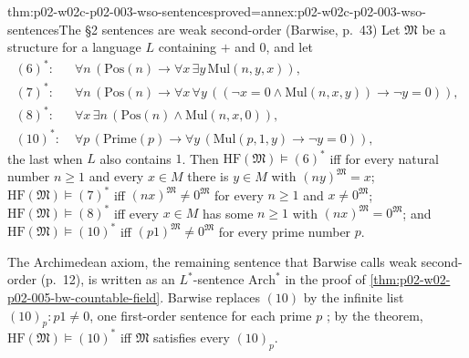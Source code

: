 \begin{hbtheorem}{thm:p02-w02c-p02-003-wso-sentences}{proved=annex:p02-w02c-p02-003-wso-sentences}{The \S2 sentences are weak second-order (Barwise, p.~43)}
Let \(\mathfrak M\) be a structure for a language \(L\) containing \(+\)
and \(0\), and let
\begin{align*}
(6)^{*}\colon\;&\forall n\,(\mathrm{Pos}(n)\to\forall x\,\exists y\,
  \mathrm{Mul}(n,y,x)),\\
(7)^{*}\colon\;&\forall n\,(\mathrm{Pos}(n)\to\forall x\,\forall y\,
  ((\neg x=0\land\mathrm{Mul}(n,x,y))\to\neg y=0)),\\
(8)^{*}\colon\;&\forall x\,\exists n\,(\mathrm{Pos}(n)\land
  \mathrm{Mul}(n,x,0)),\\
(10)^{*}\colon\;&\forall p\,(\mathrm{Prime}(p)\to\forall y\,
  (\mathrm{Mul}(p,1,y)\to\neg y=0)),
\end{align*}
the last when \(L\) also contains \(1\).  Then
\(\mathrm{HF}(\mathfrak M)\models(6)^{*}\) iff for every natural number
\(n\geq1\) and every \(x\in M\) there is \(y\in M\) with
\((ny)^{\mathfrak M}=x\); \(\mathrm{HF}(\mathfrak M)\models(7)^{*}\) iff
\((nx)^{\mathfrak M}\neq0^{\mathfrak M}\) for every \(n\geq1\) and
\(x\neq0^{\mathfrak M}\); \(\mathrm{HF}(\mathfrak M)\models(8)^{*}\) iff
every \(x\in M\) has some \(n\geq1\) with
\((nx)^{\mathfrak M}=0^{\mathfrak M}\); and
\(\mathrm{HF}(\mathfrak M)\models(10)^{*}\) iff
\((p1)^{\mathfrak M}\neq0^{\mathfrak M}\) for every prime number \(p\).
\end{hbtheorem}

The Archimedean axiom, the remaining sentence that Barwise calls weak
second-order (p.~12), is written as an \(L^{*}\)-sentence
\(\mathrm{Arch}^{*}\) in the proof of
\cref{thm:p02-w02-p02-005-bw-countable-field}.  Barwise replaces
\((10)\) by the infinite list \((10)_p\colon p1\neq0\), one first-order
sentence for each prime \(p\) \cite[ch.~A.1, \S2, p.~15]{Barwise1977FirstOrder};
by the theorem, \(\mathrm{HF}(\mathfrak M)\models(10)^{*}\) iff
\(\mathfrak M\) satisfies every \((10)_p\).

